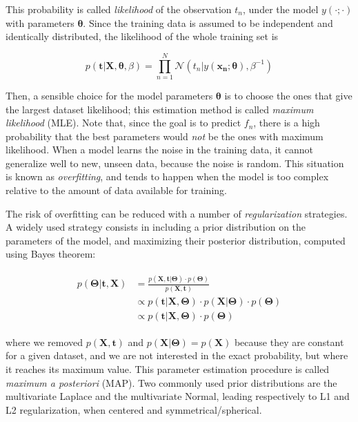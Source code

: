 \documentclass[12pt]{book}
\begin{document}
This probability is called \emph{likelihood} of the observation $t_n$, under the model $y(\cdot;\cdot)$ with parameters $\bm{\theta}$. Since the training data is assumed to be independent and identically distributed, the likelihood of the whole training set is

\begin{equation}
\label{eq:likelihood}
p(\bm{t}\vert\bm{X}, \bm{\theta},\beta)=\prod_{n=1}^N  \mathcal{N}(t_n\vert y(\bm{x_n};\bm\theta),\beta^{-1})
\end{equation}

Then, a sensible choice for the model parameters $\bm{\theta}$ is to choose the ones that give the largest dataset likelihood; this estimation method is called \emph{maximum likelihood} (MLE). Note that, since the goal is to predict $f_n$, there is a high probability that the best parameters would \emph{not} be the ones with maximum likelihood. When a model learns the noise in the training data, it cannot generalize well to new, unseen data, because the noise is random. This situation is known as \emph{overfitting}, and tends to happen when the model is too complex relative to the amount of data available for training.

The risk of overfitting can be reduced with a number of \emph{regularization} strategies. A widely used strategy consists in including a prior distribution on the parameters of the model, and maximizing their posterior distribution, computed using Bayes theorem:


\begin{align}
\begin{split}
\label{eq:map}
p(\bm\Theta\vert\bm t, \bm X)&=\frac{p(\bm X, \bm t\vert\bm\Theta)\cdot p(\bm\Theta)}{p(\bm X, \bm t)}\\
&\propto p(\bm t\vert \bm X,\bm\Theta)\cdot p(\bm X\vert\bm\Theta)\cdot p(\bm\Theta)\\
&\propto p(\bm t\vert \bm X,\bm\Theta)\cdot p(\bm\Theta)
\end{split}
\end{align}


where we removed $p(\bm X,\bm t)$ and $p(\bm X\vert\bm\Theta)=p(\bm X)$ because they are constant for a given dataset, and we are not interested in the exact probability, but where it reaches its maximum value. This parameter estimation procedure is called \emph{maximum a posteriori} (MAP). Two commonly used prior distributions are the multivariate Laplace and the multivariate Normal, leading respectively to L1 and L2 regularization, when centered and symmetrical/spherical.
\end{document}
